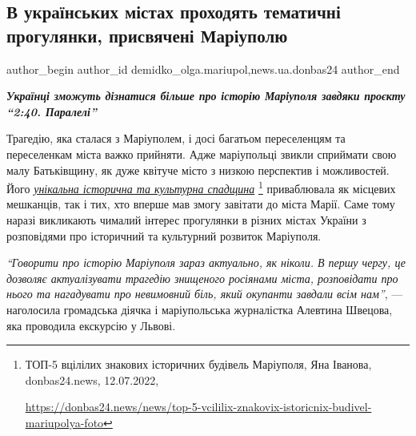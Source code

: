  
 
 
 
 
 
\subsection{В українських містах проходять тематичні прогулянки, присвячені Маріуполю}
\label{sec:14_11_2022.stz.news.ua.donbas24.1.ukr_mista_tematychni_proguljanky_prysv_mrpl}
 
\ifcmt
 author_begin
   author_id demidko_olga.mariupol,news.ua.donbas24
 author_end
\fi


\begin{center}
  \em\color{blue}\bfseries\Large
Українці зможуть дізнатися більше про історію Маріуполя завдяки проєкту \enquote{2:40. Паралелі}
\end{center}

Трагедію, яка сталася з Маріуполем, і досі багатьом переселенцям та
переселенкам міста важко прийняти. Адже маріупольці звикли сприймати свою малу
Батьківщину, як дуже квітуче місто з низкою перспектив і можливостей. Його
\href{https://donbas24.news/news/top-5-vcililix-znakovix-istoricnix-budivel-mariupolya-foto}{\emph{унікальна історична та культурна спадщина}}%
\footnote{ТОП-5 вцілілих знакових історичних будівель Маріуполя, Яна Іванова, donbas24.news, 12.07.2022, \par\url{https://donbas24.news/news/top-5-vcililix-znakovix-istoricnix-budivel-mariupolya-foto}}
 приваблювала як місцевих мешканців, так і тих, хто вперше мав змогу завітати до міста Марії. Саме тому наразі
викликають чималий інтерес прогулянки в різних містах України з розповідями про
історичний та культурний розвиток Маріуполя.

\begin{leftbar}
\emph{\enquote{Говорити про історію Маріуполя зараз актуально, як ніколи. В першу чергу,
це дозволяє актуалізувати трагедію знищеного росіянами міста, розповідати про
нього та нагадувати про невимовний біль, який окупанти завдали всім нам}}, —
наголосила громадська діячка і маріупольська журналістка Алевтина Швецова, яка
проводила екскурсію у Львові.
\end{leftbar}

